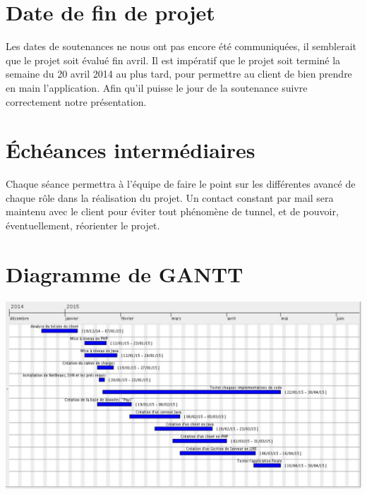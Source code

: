 \documentclass[12pt,a4paper,article]{memoir} %
\begin{document}
\section{Date de fin de projet}
Les dates de soutenances ne nous ont pas encore été communiquées, il semblerait que le
projet soit évalué fin avril.
Il est impératif que le projet soit terminé la semaine du 20 avril 2014 au plus tard, pour
permettre au client de bien prendre en main l'application. Afin qu'il puisse le jour de la
soutenance suivre correctement notre présentation.

\section{Échéances intermédiaires}
Chaque séance permettra à l'équipe de faire le point sur les différentes avancé de chaque rôle
dans la
réalisation du projet.
Un contact constant par mail sera maintenu avec le client pour éviter tout phénomène de
tunnel, et de pouvoir, éventuellement, réorienter le projet.

\section{Diagramme de GANTT}
\includegraphics[scale = 0.4]{images/Image8}
\end{document}
